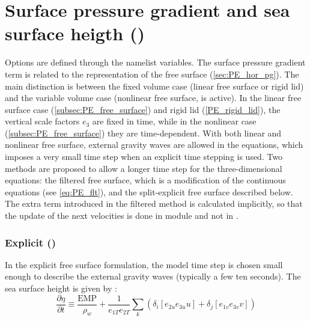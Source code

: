 \documentclass[../tex_main/NEMO_manual]{subfiles}
\begin{document}
\section{Surface pressure gradient and sea surface heigth (\protect{})}
\label{sec:DYN_hpg_spg}

Options are defined through the   namelist variables.
The surface pressure gradient term is related to the representation of the free surface (\autoref{sec:PE_hor_pg}). The main distinction is between the fixed volume case (linear free surface or rigid lid) and the variable volume case (nonlinear free surface,  is active). In the linear free surface case (\autoref{subsec:PE_free_surface}) and rigid lid (\autoref{PE_rigid_lid}), the vertical scale factors $e_{3}$ are fixed in time, while in the nonlinear case (\autoref{subsec:PE_free_surface}) they are time-dependent. With both linear and nonlinear free surface, external gravity waves are allowed in the equations, which imposes a very small time step when an explicit time stepping is used. Two methods are proposed to allow a longer time step for the three-dimensional equations: the filtered free surface, which is a modification of the continuous equations (see \autoref{eq:PE_flt}), and the split-explicit free surface described below. The extra term introduced in the filtered method is calculated implicitly, so that the update of the next velocities is done in module  and not in .

\subsubsection{Explicit (\protect{})}
\label{subsec:DYN_spg_exp}

In the explicit free surface formulation, the model time step is chosen small enough to describe the external gravity waves (typically a few ten seconds). The sea surface height is given by :
\begin{equation} \label{eq:dynspg_ssh}
\frac{\partial \eta }{\partial t}\equiv \frac{\text{EMP}}{\rho _w }+\frac{1}{e_{1T} 
e_{2T} }\sum\limits_k {\left( {\delta _i \left[ {e_{2u} e_{3u} u} 
\right]+\delta _j \left[ {e_{1v} e_{3v} v} \right]} \right)} 
\end{equation}
\end{document}
